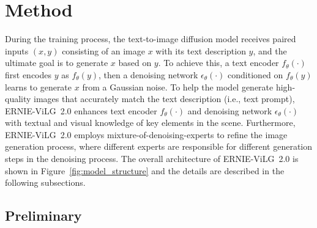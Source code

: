 \documentclass[10pt,twocolumn,letterpaper]{article}
\begin{document}
\section{Method}

During the training process, the text-to-image diffusion model receives paired inputs $(x, y)$ consisting of an image $x$ with its text description $y$, and the ultimate goal is to generate $x$ based on $y$.
To achieve this, a text encoder $f_\theta(\cdot)$ first encodes $y$ as $f_\theta(y)$, then a denoising network $\epsilon_\theta(\cdot)$ conditioned on $f_\theta(y)$ learns to generate $x$ from a Gaussian noise.
To help the model generate high-quality images that accurately match the text description (i.e., text prompt), ERNIE-ViLG~2.0 enhances text encoder $f_\theta(\cdot)$ and denoising network $\epsilon_\theta(\cdot)$ with textual and visual knowledge of key elements in the scene.
Furthermore, ERNIE-ViLG~2.0 employs mixture-of-denoising-experts to refine the image generation process, where different experts are responsible for different generation steps in the denoising process.
The overall architecture of ERNIE-ViLG~2.0 is shown in Figure~\ref{fig:model_structure} and the details are described in the following subsections.




\subsection{Preliminary}
\label{sec:preliminary}
\end{document}

